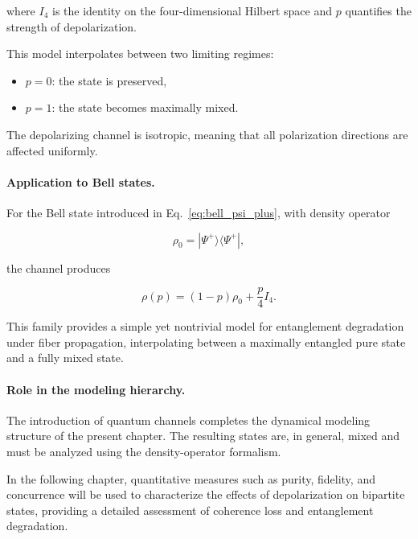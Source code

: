 where \( I_4 \) is the identity on the four-dimensional Hilbert space and \( p \) quantifies the strength of depolarization.

\medskip

This model interpolates between two limiting regimes:
\begin{itemize}
    \item \( p = 0 \): the state is preserved,
    \item \( p = 1 \): the state becomes maximally mixed.
\end{itemize}

The depolarizing channel is isotropic, meaning that all polarization directions are affected uniformly.

\medskip

\paragraph{Application to Bell states.}

For the Bell state introduced in Eq.~\eqref{eq:bell_psi_plus}, with density operator

\[
\rho_0
=
|\Psi^+\rangle\langle\Psi^+|,
\]

the channel produces

\begin{equation}
\rho(p)
=
(1-p)\rho_0
+
\frac{p}{4}I_4.
\label{eq:depolarized_bell_state}
\end{equation}

This family provides a simple yet nontrivial model for entanglement degradation under fiber propagation, interpolating between a maximally entangled pure state and a fully mixed state.

\medskip

\paragraph{Role in the modeling hierarchy.}

The introduction of quantum channels completes the dynamical modeling structure of the present chapter. The resulting states are, in general, mixed and must be analyzed using the density-operator formalism.

In the following chapter, quantitative measures such as purity, fidelity, and concurrence will be used to characterize the effects of depolarization on bipartite states, providing a detailed assessment of coherence loss and entanglement degradation.

